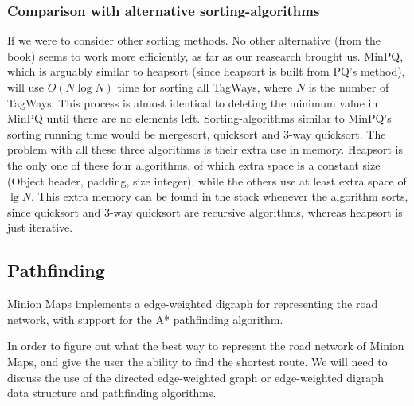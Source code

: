 \subsubsection{Comparison with alternative sorting-algorithms}
If we were to consider other sorting methods. No other alternative (from the book) seems to work more efficiently, as far as our reasearch brought us. MinPQ, which is arguably similar to heapsort (since heapsort is built from PQ’s  method), will use $O(N \log N)$ time for sorting all TagWays, where $N$ is the number of TagWays.\cite{AlgoBook/2.5} This process is almost identical to deleting the minimum value in MinPQ until there are no elements left. 
Sorting-algorithms similar to MinPQ’s sorting running time would be mergesort, quicksort and 3-way quicksort. The problem with all these three algorithms is their extra use in memory. Heapsort is the only one of these four algorithms, of which extra space is a constant size (Object header, padding, size integer), while the others use at least extra space of $\lg N$.\cite{AlgoBook/2.5} This extra memory can be found in the stack whenever the algorithm sorts, since quicksort and 3-way quicksort are recursive algorithms, whereas heapsort is just iterative. 
\subsection{Pathfinding}
Minion Maps implements a edge-weighted digraph for representing the road network, with support for the A* pathfinding algorithm.\par
In order to figure out what the best way to represent the road network of Minion Maps, and give the user the ability to find the shortest route. We will need to discuss the use of the directed edge-weighted graph or edge-weighted digraph data structure and pathfinding algorithms. 

